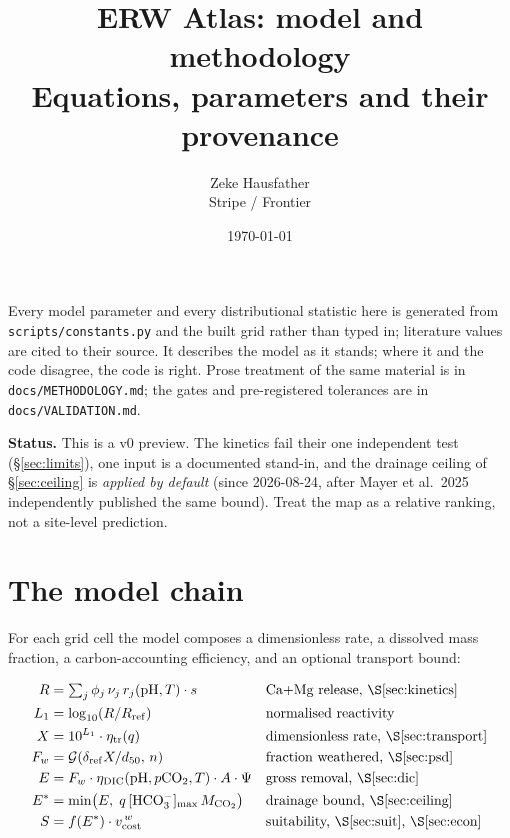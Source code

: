 \documentclass[11pt,a4paper]{article}
\title{\vspace{-1.6cm}ERW Atlas: model and methodology\\
\large Equations, parameters and their provenance}
\author{Zeke Hausfather\\\small Stripe / Frontier}
\date{\today}
\newcommand{\cotwo}{\ensuremath{\mathrm{CO_2}}}
\newcommand{\hco}{\ensuremath{\mathrm{HCO_3^-}}}
\begin{document}
\maketitle
\vspace{-0.6cm}

\begin{tcolorbox}[colback=Gainsboro!22,colframe=Gray,boxrule=0.4pt,arc=2pt]
\small
Every model parameter and every distributional statistic here is generated from
\texttt{scripts/constants.py} and the built grid rather than typed in; literature
values are cited to their source. It describes the model as it stands; where it and
the code disagree, the code is right. Prose treatment of the same material is in
\texttt{docs/METHODOLOGY.md}; the gates and pre-registered tolerances are in
\texttt{docs/VALIDATION.md}.

\textbf{Status.} This is a v0 preview. The kinetics fail their one independent
test (\S\ref{sec:limits}), one input is a documented stand-in, and the drainage
ceiling of \S\ref{sec:ceiling} is \emph{applied by default} (since 2026-08-24,
after Mayer et al.\ 2025 independently published the same bound). Treat the map
as a relative ranking, not a site-level prediction.
\end{tcolorbox}

\tableofcontents

\section{The model chain}

For each grid cell the model composes a dimensionless rate, a dissolved mass
fraction, a carbon-accounting efficiency, and an optional transport bound:

\begin{align}
R &= \textstyle\sum_j \phi_j\, \nu_j\, r_j(\mathrm{pH}, T) \cdot s
   && \text{Ca+Mg release, \S\ref{sec:kinetics}} \\
L_1 &= \log_{10}\!\left(R / R_{\mathrm{ref}}\right)
   && \text{normalised reactivity} \\
X &= 10^{L_1} \cdot \eta_{\mathrm{tr}}(q)
   && \text{dimensionless rate, \S\ref{sec:transport}} \\
F_w &= \mathcal{G}\!\left(\delta_{\mathrm{ref}} X / d_{50},\, n\right)
   && \text{fraction weathered, \S\ref{sec:psd}} \\
E &= F_w \cdot \eta_{\mathrm{DIC}}(\mathrm{pH}, p\mathrm{CO_2}, T)
     \cdot A \cdot \Psi
   && \text{gross removal, \S\ref{sec:dic}} \\
E^{\ast} &= \min\!\left(E,\; q\,[\hco]_{\max}\, M_{\cotwo}\right)
   && \text{drainage bound, \S\ref{sec:ceiling}} \\
S &= f(E^{\ast}) \cdot v_{\mathrm{cost}}^{\,w}
   && \text{suitability, \S\ref{sec:suit}, \S\ref{sec:econ}}
\end{align}
\end{document}
